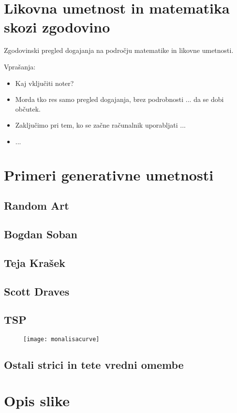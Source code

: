 \chapter{Likovna umetnost in matematika skozi zgodovino}
%
Zgodovinski pregled dogajanja na področju matematike in likovne umetnosti.

Vprašanja:
\begin{itemize}
  \item Kaj vključiti noter?
  \item Morda tko res samo pregled dogajanja, brez podrobnosti ... da se dobi občutek.
  \item Zaključimo pri tem, ko se začne računalnik uporabljati ...
  \item ...
\end{itemize}

\chapter{Primeri generativne umetnosti}
%
\section{Random Art}
\section{Bogdan Soban}
\section{Teja Krašek}
\section{Scott Draves}
\section{TSP}
\begin{figure}[htb]
\texttt{[image: monalisacurve]}
\end{figure}
\section{Ostali strici in tete vredni omembe}

\chapter{Opis slike}

